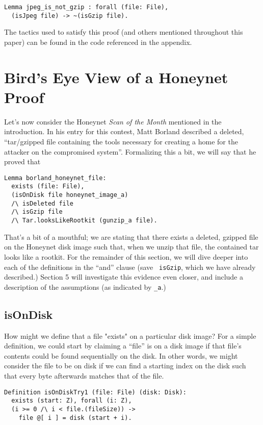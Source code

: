 \documentclass[nocopyrightspace]{sigplanconf}
\begin{document}
\begin{lstlisting}
Lemma jpeg_is_not_gzip : forall (file: File),
  (isJpeg file) -> ~(isGzip file).
\end{lstlisting}

The tactics used to satisfy this proof (and others mentioned throughout this
paper) can be found in the code referenced in the appendix.

\section{Bird's Eye View of a Honeynet Proof}

Let's now consider the Honeynet {\it Scan of the Month} mentioned in the
introduction. In his entry for this contest, Matt 
Borland\cite{borland-honeynet} described a deleted, ``tar/gzipped file
containing the tools necessary for creating a home for the attacker on the
compromised system''. Formalizing this a bit, we will say that he proved that

\begin{lstlisting}
Lemma borland_honeynet_file:
  exists (file: File),
  (isOnDisk file honeynet_image_a)
  /\ isDeleted file
  /\ isGzip file
  /\ Tar.looksLikeRootkit (gunzip_a file).
\end{lstlisting}

That's a bit of a mouthful; we are stating that there exists a deleted,
gzipped file on the Honeynet disk image such that, when we unzip that file,
the contained tar looks like a rootkit. For the remainder of this section, we
will dive deeper into each of the definitions in the ``and'' clause (save {\tt
isGzip}, which we have already described.) Section 5 will investigate this
evidence even closer, and include a description of the assumptions (as
indicated by {\tt \_a}.)

\subsection{isOnDisk}

How might we define that a file "exists" on a particular disk image? For a
simple definition, we could start by claiming a ``file'' is on a disk image if
that file's contents could be found sequentially on the disk. In other words,
we might consider the file to be on disk if we can find a starting index on
the disk such that every byte afterwards matches that of the file.

\begin{lstlisting}
Definition isOnDiskTry1 (file: File) (disk: Disk):
  exists (start: Z), forall (i: Z),
  (i >= 0 /\ i < file.(fileSize)) -> 
    file @[ i ] = disk (start + i).
\end{lstlisting}
\end{document}
